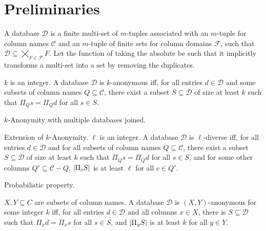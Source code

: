 \documentclass[12pt]{llncs}
\DeclarePairedDelimiter{\abs}{\lvert}{\rvert}
\newcommand{\Proj}[1]{\Pi_{#1}}
\newcommand{\cC}{\mathcal{C}}
\newcommand{\cD}{\mathcal{D}}
\newcommand{\cF}{\mathcal{F}}
\begin{document}

\section{Preliminaries}
\begin{definition}
A database $\cD$ is a finite multi-set of $m$-tuples associated with an $m$-tuple for column names $\cC$ and an $m$-tuple of finite sets for column domains $\cF$, such that $\cD \subseteq \bigtimes_{F \in \cF} F$. Let the function of taking the absolute be such that it implicitly transforms a multi-set into a set by removing the duplicates.
\end{definition}

\begin{definition}[$k$-Anonymity]
$k$ is an integer. A database $\cD$ is $k$-anonymous iff, for all entries $d \in \cD$ and some subsets of column names $Q \subseteq \cC$, there exist a subset $S \subseteq \cD$ of size at least $k$ such that $\Proj{Q} s = \Proj{Q} d$ for all $s \in S$.
\end{definition}

\begin{definition}
$k$-Anonymity with multiple databases joined.
\end{definition}

\begin{definition}
Extension of $k$-Anonymity. $\ell$ is an integer. A database $\cD$ is $\ell$-diverse iff, for all entries $d \in \cD$ and for all subsets of column names $Q \subseteq \cC$, there exist a subset $S \subseteq \cD$ of size at least $k$ such that $\Proj{Q} s = \Proj{Q} d$ for all $s \in S$, and for some other columns $Q' \subseteq \cC - Q$, $\abs{\Proj{c} S}$ is at least $\ell$ for all $c \in Q'$.
\end{definition}

\begin{definition}
Probabilistic property.
\end{definition}

\begin{definition}
\end{definition}

\begin{definition}[$(X,Y)$-Privacy]
$X,Y \subseteq C$ are subsets of column names. A database $\cD$ is $(X,Y)$-anonymous for some integer $k$ iff, for all entries $d \in \cD$ and all columns $x \in X$, there is $S \subseteq \cD$ such that $\Proj{x} d = \Proj{x} s$ for all $s \in S$, and $\abs{\Proj{y} S}$ is at least $k$ for all $y \in Y$.
\end{definition}
\end{document}
